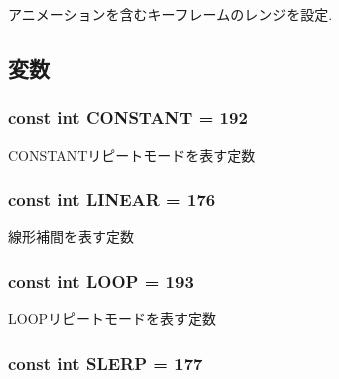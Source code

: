 アニメーションを含むキーフレームのレンジを設定. 

\subsection{変数}
\hypertarget{classm3g_1_1KeyframeSequence_b45ff833865ae8962be27923995f91a3}{
\subsubsection[{CONSTANT}]{\setlength{\rightskip}{0pt plus 5cm}const int {\bf CONSTANT} = 192}}
\label{classm3g_1_1KeyframeSequence_b45ff833865ae8962be27923995f91a3}


CONSTANTリピートモードを表す定数 \hypertarget{classm3g_1_1KeyframeSequence_23ccf193c67257f1be26417041cecb31}{
\subsubsection[{LINEAR}]{\setlength{\rightskip}{0pt plus 5cm}const int {\bf LINEAR} = 176}}
\label{classm3g_1_1KeyframeSequence_23ccf193c67257f1be26417041cecb31}


線形補間を表す定数 \hypertarget{classm3g_1_1KeyframeSequence_ecc439231d4f3639e6f6a9625615a0f7}{
\subsubsection[{LOOP}]{\setlength{\rightskip}{0pt plus 5cm}const int {\bf LOOP} = 193}}
\label{classm3g_1_1KeyframeSequence_ecc439231d4f3639e6f6a9625615a0f7}


LOOPリピートモードを表す定数 \hypertarget{classm3g_1_1KeyframeSequence_77ebb943765f530d2883e1c26127d3ce}{
\subsubsection[{SLERP}]{\setlength{\rightskip}{0pt plus 5cm}const int {\bf SLERP} = 177}}
\label{classm3g_1_1KeyframeSequence_77ebb943765f530d2883e1c26127d3ce}


